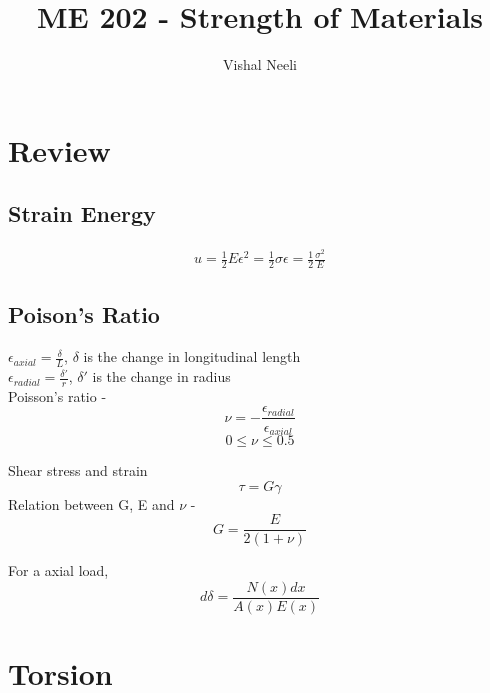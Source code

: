 \documentclass{article}
\title{ME 202 - Strength of Materials}
\author{Vishal Neeli}
\date{}
\begin{document}
\maketitle

\section{Review}
	\subsection{Strain Energy}
	\begin{align*}
		u = \frac{1}{2} E \epsilon^2 = \frac{1}{2} \sigma \epsilon = \frac{1}{2} \frac{\sigma^2}{E}
	\end{align*}

	\subsection{Poison's Ratio}

	$\epsilon_{axial}= \frac{\delta}{L}$, $\delta$ is the change in longitudinal length\\
	$\epsilon_{radial}= \frac{\delta'}{r}$, $\delta'$ is the change in radius\\

	Poisson's ratio -
	\[\nu = -\frac{\epsilon_{radial}}{\epsilon_{axial}}\]
	\[0\leq \nu \leq 0.5\]

	Shear stress and strain
	\[\tau = G \gamma\]
	Relation between G, E and $\nu$ - 
	\[G= \frac{E}{2(1+\nu)}\]

	For a axial load, 
	\[d\delta = \frac{N(x) dx}{A(x) E(x)}\]


\section{Torsion}
\end{document}
